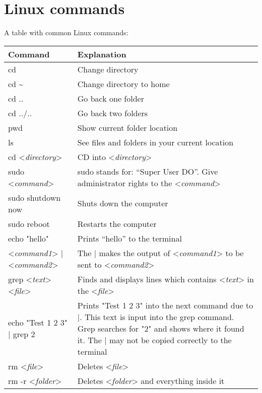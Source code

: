 \documentclass{article}
\begin{document}
	
	\section{Linux commands}
	
	
	
	\newcommand{\cmd}[1]{<\textit{#1}>}
	
	\renewcommand{\arraystretch}{1.3}
	
	A table with common Linux commands:
		
		
	\begin{tabularx}{\textwidth}{lX} \hline
		\bfseries Command & \bfseries Explanation \\ \hline 
		cd & Change directory  \\ \hline
		cd \textasciitilde & Change directory to home \\ \hline
		cd .. & Go back one folder \\ \hline
		cd ../.. & Go back two folders \\ \hline
		pwd & Show current folder location \\ \hline
		ls & See files and folders in your current location \\ \hline
		cd \cmd{directory} & CD into \cmd{directory} \\ \hline
		sudo \cmd{command} & sudo stands for: ``Super User DO''. Give administrator rights to the \cmd{command} \\ \hline
		sudo shutdown now & Shuts down the computer \\ \hline
		sudo reboot & Restarts the computer \\ \hline
		echo "hello" & Prints ``hello'' to the terminal \\ \hline
		\cmd{command1} $|$ \cmd{command2} & The $|$ makes the output of \cmd{command1} to be sent to \cmd{command2}\\ \hline
		grep \cmd{text} \cmd{file} & Finds and displays lines which contains \cmd{text} in the \cmd{file} \\ \hline
		echo "Test 1 2 3" $|$ grep 2 & Prints "Test 1 2 3" into the next command due to $|$. This text is input into the grep command. Grep searches for "2" and shows where it found it. The $|$ may not be copied correctly to the terminal \\ \hline
		rm \cmd{file} & Deletes \cmd{file} \\ \hline
		rm -r \cmd{folder} & Deletes \cmd{folder} and everything inside it \\ \hline

\end{tabularx}
\end{document}
